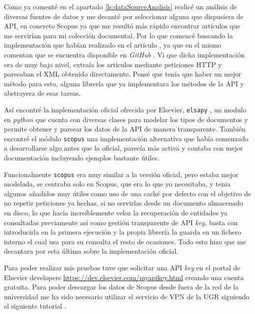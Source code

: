 Como ya comenté en el apartado \ref{ls:dataSourceAnalisis} realicé un análisis de diversas fuentes de datos y me decanté por seleccionar alguna que dispusiera de \acrshort{API}, en concreto Scopus ya que me resultó más rápido encontrar artículos que me servirían para mi colección documental. Por lo que comencé buscando la implementación que habían realizado en el artículo \cite{DBLP:conf/ecir/SarolLS18}, ya que en el mismo comentan que se encuentra disponible en \textit{GitHub} \cite{bir_scopus_gh}. Vi que dicha implementación era de muy bajo nivel, extraía los artículos mediante peticiones \acrshort{HTTP} y parseaban el \acrshort{XML} obtenido directamente. Pensé que tenía que haber un mejor método para esto, alguna librería que ya implementara los métodos de la \acrshort{API} y abstrayera de esas tareas. 

Así encontré la implementación oficial ofrecida por Elsevier, \texttt{elsapy} \cite{elsapy}, un modulo en \textit{python} que cuenta con diversas clases para modelar los tipos de documentos y permite obtener y parsear los datos de la \acrshort{API} de manera transparente. También encontré el módulo \texttt{scopus} \cite{scopus-api} una implementación alternativa que había comenzado a desarrollarse algo antes que la oficial, parecía más activa y contaba con mejor documentación incluyendo ejemplos bastante útiles. 

Funcionalmente \texttt{scopus} era muy similar a la versión oficial, pero estaba mejor modelada, se centraba solo en Scopus, que era lo que yo necesitaba, y tenia algunos añadidos muy útiles como uso de una caché por defecto con el objetivo de no repetir peticiones ya hechas, si no servirlas desde un documento almacenado en disco, lo que hacia increíblemente veloz la recuperación de entidades ya consultadas previamente así como gestión transparente de \acrshort{API} \textit{key}, basta con introducirla en la primera ejecución y la propia librería la guarda en un fichero interno el cual usa para su consulta el resto de ocasiones. Todo esto hizo que me decantara por esta última sobre la implementación oficial.

Para poder realizar mis pruebas tuve que solicitar una \acrshort{API} \textit{key} en el portal de Elsevier developers \url{https://dev.elsevier.com/myapikey.html} creando una cuenta gratuita. Para poder descargar los datos de Scopus desde fuera de la red de la universidad me ha sido necesario utilizar el servicio de \acrshort{VPN} de la \acrshort{UGR} siguiendo el siguiente tutorial \cite{vpnUGR}.

